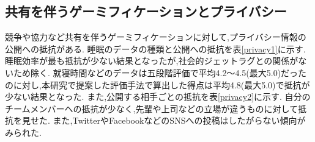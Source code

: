 \begin{table}[htbp]
	\begin{center}
 	\end{center}
 	\caption{最終アンケート:協力について}
 	\label{team}
\end{table}

\subsection{共有を伴うゲーミフィケーションとプライバシー}
競争や協力など共有を伴うゲーミフィケーションに対して,プライバシー情報の公開への抵抗がある.
睡眠のデータの種類と公開への抵抗を表\ref{privacy1}に示す.
睡眠効率が最も抵抗が少ない結果となったが,社会的ジェットラグとの関係がないため除く.
就寝時間などのデータは五段階評価で平均4.2〜4.5(最大5.0)だったのに対し,本研究で提案した評価手法で算出した得点は平均4.8(最大5.0)で抵抗が少ない結果となった.
また,公開する相手ごとの抵抗を表\ref{privacy2}に示す.
自分のチームメンバーへの抵抗が少なく,先輩や上司などの立場が違うものに対して抵抗を見せた.
また,TwitterやFacebookなどのSNSへの投稿はしたがらない傾向がみられた.

\begin{table}[htbp]
	\begin{center}
 	\end{center}
 	\caption{最終アンケート:睡眠データの種類ごとに公開への抵抗}
 	\label{privacy1}
\end{table}

